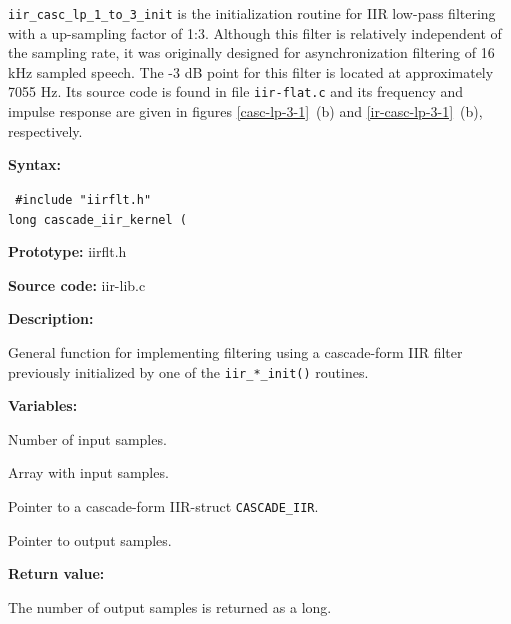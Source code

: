 {\tt iir\_casc\_lp\_1\_to\_3\_init} is the initialization routine for
IIR low-pass filtering with a up-sampling factor of 1:3. Although this
filter is relatively independent of the sampling rate, it was
originally designed for asynchronization filtering of 16 kHz sampled
speech. The -3 dB point for this filter is located at approximately
7055 Hz. Its source code is found in file {\tt iir-flat.c} and its
frequency and impulse response are given in figures
\ref{casc-lp-3-1}~(b) and \ref{ir-casc-lp-3-1}~(b), respectively.


\newpage


{\bf Syntax: }

{\tt
\#include "iirflt.h"\\
long cascade\_iir\_kernel (
}

{\bf Prototype: }    iirflt.h

{\bf Source code: }  iir-lib.c

{\bf Description: }

General function for implementing filtering using a cascade-form IIR
filter previously initialized by one of the {\tt iir\_*\_init()} routines.

{\bf Variables: }
\begin{Descr}{\DescrLen}
\item[\pbox{20mm}{\em lseg}] %
        Number of input samples.

\item[\pbox{20mm}{\em x\_ptr}] %
        Array with input samples.

\item[\pbox{20mm}{\em iir\_ptr}] %
        Pointer to a cascade-form IIR-struct {\tt CASCADE\_IIR}.

\item[\pbox{20mm}{\em y\_ptr}] %
        Pointer to output samples.
\end{Descr}


{\bf Return value: }

The number of output samples is returned as a long.

